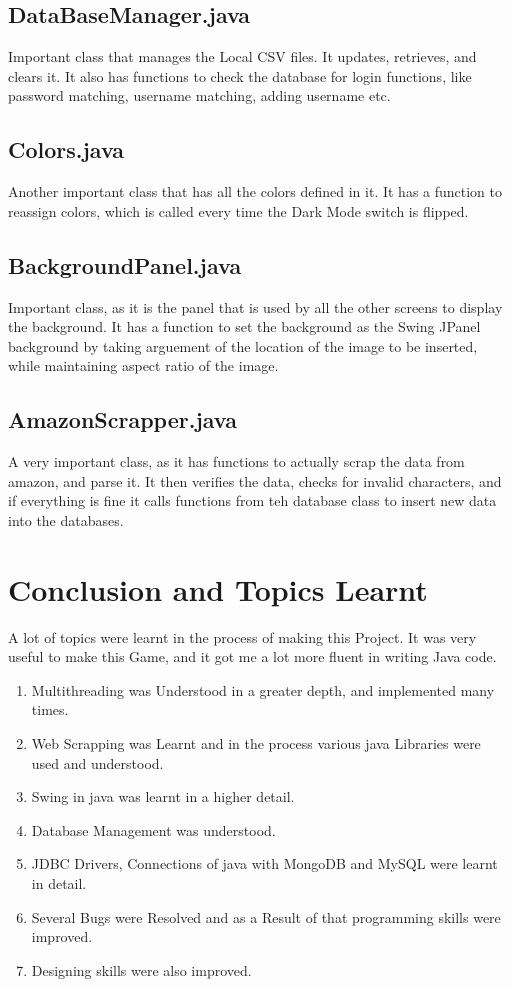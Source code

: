 \documentclass[11pt]{article}
\begin{document}
\subsection{  DataBaseManager.java}
Important class that manages the Local CSV files. It updates, retrieves, and clears it. It also has functions to check the database for login functions, like password matching, username matching, adding username etc. 
\subsection{  Colors.java}
Another important class that has all the colors defined in it. It has a function to reassign colors, which is called every time the Dark Mode switch is flipped. 
\subsection{  BackgroundPanel.java}
Important class, as it is the panel that is used by all the other screens to display the background. It has a function to set the background as the Swing JPanel background by taking arguement of the location of the image to be inserted, while maintaining aspect ratio of the image. 

\subsection{  AmazonScrapper.java}
A very important class, as it has functions to actually scrap the data from amazon, and parse it. It then verifies the data, checks for invalid characters, and if everything is fine it calls functions from teh database class to insert new data into the databases. 

\section{Conclusion and Topics Learnt}
A lot of topics were learnt in the process of making this Project. It was very useful to make this Game, and it got me a lot more fluent in writing Java code.
\begin{enumerate}
	\item Multithreading was Understood in a greater depth, and implemented many times. 
	\item Web Scrapping was Learnt and in the process various java Libraries were used and understood.
	\item Swing in java was learnt in a higher detail.
	\item Database Management was understood. 
	\item JDBC Drivers, Connections of java with MongoDB and MySQL were learnt in detail. 
	\item Several Bugs were Resolved and as a Result of that programming skills were improved. 
	\item Designing skills were also improved.  
\end{enumerate} 
\end{document}

